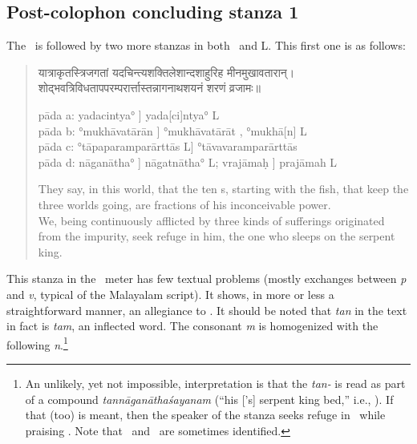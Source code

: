 \subsection{Post-colophon concluding stanza 1}
The \colophon\ is followed by two more stanzas in both \Tm\ and L\@. This first one is as follows:
\begin{verse}
{\dn यात्राकृतस्त्रिजगतां यदचिन्त्यशक्तिलेशान्दशाहुरिह मीनमुखावतारान्।\\
\kle शोद्भवत्रिविधतापपरम्परार्त्तास्तन्नागनाथशयनं शरणं व्रजामः॥}

{\footnotesize 
pāda a: yadacintya° \Tm] yada[ci]ntya° L\\
pāda b: °mukhāvatārān \Tmpc] °mukhāvatārāt \Tmac, °mukhā[n] L\\
pāda c: °tāpaparamparārttās L] °tāvavaramparārttās \Tm\ \\
pāda d: nāganātha° \Tm] nāgatnātha° L; vrajāmaḥ \Tm] prajāmah L

}
They say, in this world, that the ten \avatara s, starting with the fish, that keep the three worlds going, are fractions of his inconceivable power. \\%
We, being continuously afflicted by three kinds of sufferings originated from the impurity, seek refuge in him, the one who sleeps on the serpent king.
\end{verse}
This stanza in the \vasantatilaka\ meter has few textual problems (mostly exchanges between \emph{p} and \emph{v}, typical of the Malayalam script). It shows, in more or less a straightforward manner, an allegiance to \Visnu. 
It should be noted that \emph{tan} in the text in fact is \emph{tam}, an inflected word. The consonant \emph{m} is homogenized with the following \emph{n}.\footnote{An unlikely, yet not impossible, interpretation is that the \emph{tan-} is read as part of a compound \emph{ta\-nnāga\-nātha\-śayanam} (``his [\Visnu's] serpent king bed,'' i.e., \Sesa). If that (too) is meant, then the speaker of the stanza seeks refuge in \Sesa\ while praising \Visnu. Note that \Sesa\ and \Patanjali\ are sometimes identified.}
